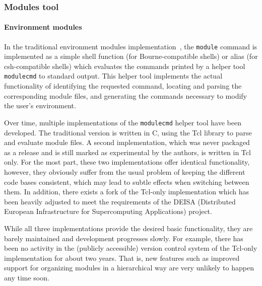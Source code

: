 
\subsubsection{Modules tool}

\paragraph{Environment modules}

In the traditional environment modules
implementation~\cite{environment_modules_paper}, the \texttt{module} command
is implemented as a simple shell function (for Bourne-compatible shells) or
alias (for csh-compatible shells) which evaluates the commands printed by a
helper tool \texttt{modulecmd} to standard output. This helper tool
implements the actual functionality of identifying the requested command,
locating and parsing the corresponding module files, and generating the
commands necessary to modify the user's environment.

Over time, multiple implementations of the \texttt{modulecmd} helper tool
have been developed. The traditional version is written in C, using the Tcl
library to parse and evaluate module files. A second implementation, which
was never packaged as a release and is still marked as experimental by the
authors, is written in Tcl only. For the most part, these two implementations
offer identical functionality, however, they obviously suffer from the usual
problem of keeping the different code bases consistent, which may lead to
subtle effects when switching between them. In addition, there exists a fork
of the Tcl-only implementation which has been heavily adjusted to meet the
requirements of the DEISA (Distributed European Infrastructure for
Supercomputing Applications) project.


While all three implementations provide the desired basic functionality, they
are barely maintained and development progresses slowly. For example, there
has been no activity in the (publicly accessible) version control system of
the Tcl-only implementation for about two years. That is, new features such
as improved support for organizing modules in a hierarchical way are very
unlikely to happen any time soon.

